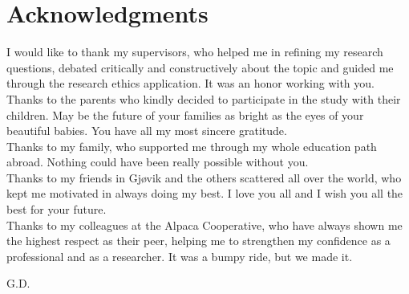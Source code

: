 \chapter*{Acknowledgments}
I would like to thank my supervisors, who helped me in refining my research questions, debated critically and constructively about the topic and guided me through the research ethics application. It was an honor working with you.\\
Thanks to the parents who kindly decided to participate in the study with their children. May be the future of your families as bright as the eyes of your beautiful babies. You have all my most sincere gratitude.\\
Thanks to my family, who supported me through my whole education path abroad. Nothing could have been really possible without you.\\
Thanks to my friends in Gjøvik and the others scattered all over the world, who kept me motivated in always doing my best. I love you all and I wish you all the best for your future.\\
Thanks to my colleagues at the Alpaca Cooperative, who have always shown me the highest respect as their peer, helping me to strengthen my confidence as a professional and as a researcher. It was a bumpy ride, but we made it.
\begin{flushright}
G.D.\\
\end{flushright}

\hypersetup{pageanchor=false}